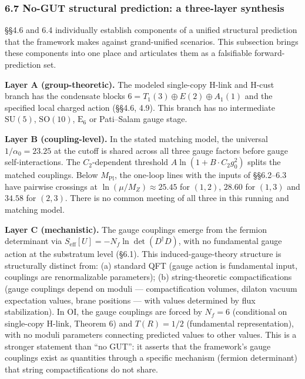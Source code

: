 \documentclass[
]{article}
\begin{document}
\hypertarget{no-gut-structural-prediction-a-three-layer-synthesis}{%
\subsubsection{6.7 No-GUT structural prediction: a three-layer
synthesis}\label{no-gut-structural-prediction-a-three-layer-synthesis}}

§§4.6 and 6.4 individually establish components of a unified structural
prediction that the framework makes against grand-unified scenarios.
This subsection brings these components into one place and articulates
them as a falsifiable forward-prediction set.

\textbf{Layer A (group-theoretic).} The modeled single-copy H-link and
H-cust branch has the condensate blocks
\(6=T_1(3)\oplus E(2)\oplus A_1(1)\) and the specified local charged
action (§§4.6, 4.9). This branch has no intermediate \(\mathrm{SU}(5)\),
\(\mathrm{SO}(10)\), \(\mathrm E_6\) or Pati--Salam gauge stage.

\textbf{Layer B (coupling-level).} In the stated matching model, the
universal \(1/\alpha_0 = 23.25\) at the cutoff is shared across all
three gauge factors before gauge self-interactions. The
\(C_2\)-dependent threshold \(A \ln(1 + B \cdot C_2 g_0^2)\) splits the
matched couplings. Below \(M_{\mathrm{Pl}}\), the one-loop lines with
the inputs of §§6.2--6.3 have pairwise crossings at
\(\ln(\mu/M_Z) \approx 25.45\) for \((1,2)\), \(28.60\) for \((1,3)\)
and \(34.58\) for \((2,3)\). There is no common meeting of all three in
this running and matching model.

\textbf{Layer C (mechanistic).} The gauge couplings emerge from the
fermion determinant via
\(S_{\mathrm{eff}}[U] = -N_f \ln \det(D^\dagger D)\), with no
fundamental gauge action at the substratum level (§6.1). This
induced-gauge-theory structure is structurally distinct from: (a)
standard QFT (gauge action is fundamental input, couplings are
renormalizable parameters); (b) string-theoretic compactifications
(gauge couplings depend on moduli --- compactification volumes, dilaton
vacuum expectation values, brane positions --- with values determined by
flux stabilization). In OI, the gauge couplings are forced by \(N_f=6\)
(conditional on single-copy H-link, Theorem 6) and \(T(R) = 1/2\)
(fundamental representation), with no moduli parameters connecting
predicted values to other values. This is a stronger statement than ``no
GUT'': it asserts that the framework's gauge couplings exist as
quantities through a specific mechanism (fermion determinant) that
string compactifications do not share.
\end{document}

